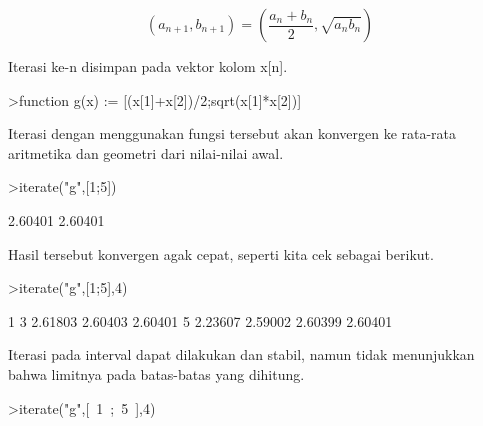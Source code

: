 \documentclass{article}
\begin{document}
\begin{eulernotebook}
\begin{eulercomment}
\begin{eulercomment}
\begin{eulercomment}
\begin{eulercomment}
\begin{eulercomment}
\begin{eulercomment}
\begin{eulercomment}
\begin{eulercomment}
\begin{eulercomment}
\begin{eulercomment}
\begin{eulercomment}
\begin{eulercomment}
\begin{eulercomment}
\begin{eulercomment}
\begin{eulercomment}
\begin{eulercomment}
\begin{eulercomment}
\begin{eulercomment}
\begin{eulercomment}
\begin{eulercomment}
\begin{eulercomment}
\begin{eulercomment}
\begin{eulercomment}
\begin{eulercomment}
\begin{eulercomment}
\begin{eulercomment}
\begin{eulercomment}
\begin{eulercomment}
\begin{eulercomment}
\begin{eulercomment}
\begin{eulercomment}
\begin{eulercomment}
\begin{eulercomment}
\end{eulercomment}
\begin{eulerformula}
\[
(a_{n+1},b_{n+1}) = \left( \frac{a_n+b_n}{2}, \sqrt{a_nb_n} \right)
\]
\end{eulerformula}
\begin{eulercomment}
Iterasi ke-n disimpan pada vektor kolom x[n].
\end{eulercomment}
\begin{eulerprompt}
>function g(x) := [(x[1]+x[2])/2;sqrt(x[1]*x[2])]
\end{eulerprompt}
\begin{eulercomment}
Iterasi dengan menggunakan fungsi tersebut akan konvergen ke rata-rata
aritmetika dan geometri dari nilai-nilai awal. 
\end{eulercomment}
\begin{eulerprompt}
>iterate("g",[1;5])
\end{eulerprompt}
\begin{euleroutput}
        2.60401 
        2.60401 
\end{euleroutput}
\begin{eulercomment}
Hasil tersebut konvergen agak cepat, seperti kita cek sebagai berikut.
\end{eulercomment}
\begin{eulerprompt}
>iterate("g",[1;5],4)
\end{eulerprompt}
\begin{euleroutput}
              1             3       2.61803       2.60403       2.60401 
              5       2.23607       2.59002       2.60399       2.60401 
\end{euleroutput}
\begin{eulercomment}
Iterasi pada interval dapat dilakukan dan stabil, namun tidak
menunjukkan bahwa limitnya pada batas-batas yang dihitung.
\end{eulercomment}
\begin{eulerprompt}
>iterate("g",[~1~;~5~],4)

\end{eulerprompt}
\end{eulercomment}
\end{eulercomment}
\end{eulercomment}
\end{eulercomment}
\end{eulercomment}
\end{eulercomment}
\end{eulercomment}
\end{eulercomment}
\end{eulercomment}
\end{eulercomment}
\end{eulercomment}
\end{eulercomment}
\end{eulercomment}
\end{eulercomment}
\end{eulercomment}
\end{eulercomment}
\end{eulercomment}
\end{eulercomment}
\end{eulercomment}
\end{eulercomment}
\end{eulercomment}
\end{eulercomment}
\end{eulercomment}
\end{eulercomment}
\end{eulercomment}
\end{eulercomment}
\end{eulercomment}
\end{eulercomment}
\end{eulercomment}
\end{eulercomment}
\end{eulercomment}
\end{eulercomment}
\end{eulernotebook}
\end{document}
